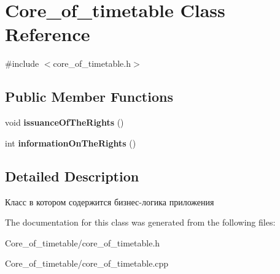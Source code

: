 \hypertarget{class_core__of__timetable}{}\section{Core\+\_\+of\+\_\+timetable Class Reference}
\label{class_core__of__timetable}


{\ttfamily \#include $<$core\+\_\+of\+\_\+timetable.\+h$>$}

\subsection*{Public Member Functions}
\begin{DoxyCompactItemize}
\item 
void {\bfseries issuance\+Of\+The\+Rights} ()\hypertarget{class_core__of__timetable_a78545bea5538cfc8663974966840d790}{}\label{class_core__of__timetable_a78545bea5538cfc8663974966840d790}

\item 
int {\bfseries information\+On\+The\+Rights} ()\hypertarget{class_core__of__timetable_ae83a3298cafbbd6c330549b183b2b1ed}{}\label{class_core__of__timetable_ae83a3298cafbbd6c330549b183b2b1ed}

\end{DoxyCompactItemize}


\subsection{Detailed Description}
Класс в котором содержится бизнес-\/логика приложения 

The documentation for this class was generated from the following files\+:\begin{DoxyCompactItemize}
\item 
Core\+\_\+of\+\_\+timetable/core\+\_\+of\+\_\+timetable.\+h\item 
Core\+\_\+of\+\_\+timetable/core\+\_\+of\+\_\+timetable.\+cpp\end{DoxyCompactItemize}
